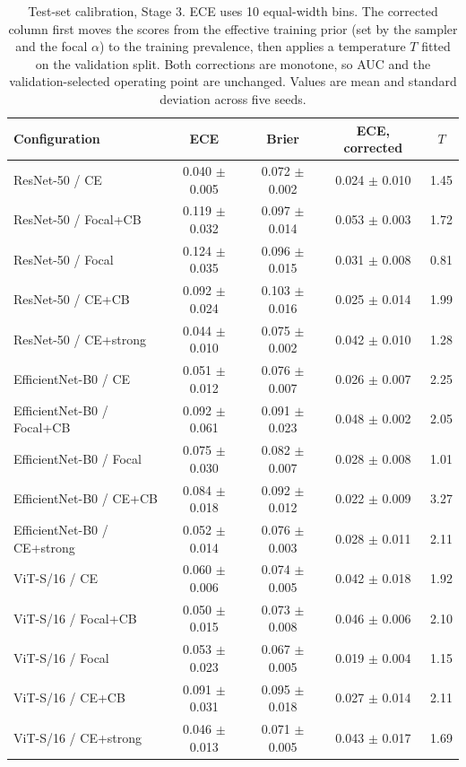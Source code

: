 \begin{table}[t]
\centering
\small
\caption{Test-set calibration, Stage 3. ECE uses 10 equal-width bins. The corrected column first moves the scores from the effective training prior (set by the sampler and the focal $\alpha$) to the training prevalence, then applies a temperature $T$ fitted on the validation split. Both corrections are monotone, so AUC and the validation-selected operating point are unchanged. Values are mean and standard deviation across five seeds.}
\label{tab:calibration}
\begin{tabular}{lcccc}
\toprule
Configuration & ECE & Brier & ECE, corrected & $T$ \\
\midrule
ResNet-50 / CE & 0.040 $\pm$ 0.005 & 0.072 $\pm$ 0.002 & 0.024 $\pm$ 0.010 & 1.45 \\
ResNet-50 / Focal+CB & 0.119 $\pm$ 0.032 & 0.097 $\pm$ 0.014 & 0.053 $\pm$ 0.003 & 1.72 \\
ResNet-50 / Focal & 0.124 $\pm$ 0.035 & 0.096 $\pm$ 0.015 & 0.031 $\pm$ 0.008 & 0.81 \\
ResNet-50 / CE+CB & 0.092 $\pm$ 0.024 & 0.103 $\pm$ 0.016 & 0.025 $\pm$ 0.014 & 1.99 \\
ResNet-50 / CE+strong & 0.044 $\pm$ 0.010 & 0.075 $\pm$ 0.002 & 0.042 $\pm$ 0.010 & 1.28 \\
EfficientNet-B0 / CE & 0.051 $\pm$ 0.012 & 0.076 $\pm$ 0.007 & 0.026 $\pm$ 0.007 & 2.25 \\
EfficientNet-B0 / Focal+CB & 0.092 $\pm$ 0.061 & 0.091 $\pm$ 0.023 & 0.048 $\pm$ 0.002 & 2.05 \\
EfficientNet-B0 / Focal & 0.075 $\pm$ 0.030 & 0.082 $\pm$ 0.007 & 0.028 $\pm$ 0.008 & 1.01 \\
EfficientNet-B0 / CE+CB & 0.084 $\pm$ 0.018 & 0.092 $\pm$ 0.012 & 0.022 $\pm$ 0.009 & 3.27 \\
EfficientNet-B0 / CE+strong & 0.052 $\pm$ 0.014 & 0.076 $\pm$ 0.003 & 0.028 $\pm$ 0.011 & 2.11 \\
ViT-S/16 / CE & 0.060 $\pm$ 0.006 & 0.074 $\pm$ 0.005 & 0.042 $\pm$ 0.018 & 1.92 \\
ViT-S/16 / Focal+CB & 0.050 $\pm$ 0.015 & 0.073 $\pm$ 0.008 & 0.046 $\pm$ 0.006 & 2.10 \\
ViT-S/16 / Focal & 0.053 $\pm$ 0.023 & 0.067 $\pm$ 0.005 & 0.019 $\pm$ 0.004 & 1.15 \\
ViT-S/16 / CE+CB & 0.091 $\pm$ 0.031 & 0.095 $\pm$ 0.018 & 0.027 $\pm$ 0.014 & 2.11 \\
ViT-S/16 / CE+strong & 0.046 $\pm$ 0.013 & 0.071 $\pm$ 0.005 & 0.043 $\pm$ 0.017 & 1.69 \\
\bottomrule
\end{tabular}
\end{table}
